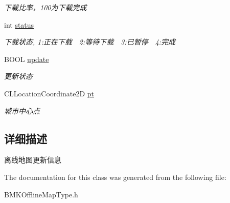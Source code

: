 \begin{DoxyCompactItemize}
\begin{DoxyCompactList}\small\item\em 下载比率，100为下载完成 \end{DoxyCompactList}\item 
\hypertarget{interface_b_m_k_o_l_update_element_a1e980d13929fc0dc732edddf1ae13bf2}{int \hyperlink{interface_b_m_k_o_l_update_element_a1e980d13929fc0dc732edddf1ae13bf2}{status}}\label{interface_b_m_k_o_l_update_element_a1e980d13929fc0dc732edddf1ae13bf2}

\begin{DoxyCompactList}\small\item\em 下载状态, 1\-:正在下载　2\-:等待下载　3\-:已暂停　4\-:完成 \end{DoxyCompactList}\item 
\hypertarget{interface_b_m_k_o_l_update_element_a1adc137eba11d9ae142310d3556bc446}{B\-O\-O\-L \hyperlink{interface_b_m_k_o_l_update_element_a1adc137eba11d9ae142310d3556bc446}{update}}\label{interface_b_m_k_o_l_update_element_a1adc137eba11d9ae142310d3556bc446}

\begin{DoxyCompactList}\small\item\em 更新状态 \end{DoxyCompactList}\item 
\hypertarget{interface_b_m_k_o_l_update_element_a9e229b507ced476146db8f80c71ea5bd}{C\-L\-Location\-Coordinate2\-D \hyperlink{interface_b_m_k_o_l_update_element_a9e229b507ced476146db8f80c71ea5bd}{pt}}\label{interface_b_m_k_o_l_update_element_a9e229b507ced476146db8f80c71ea5bd}

\begin{DoxyCompactList}\small\item\em 城市中心点 \end{DoxyCompactList}\end{DoxyCompactItemize}


\subsection{详细描述}
离线地图更新信息 

The documentation for this class was generated from the following file\-:\begin{DoxyCompactItemize}
\item 
B\-M\-K\-Offline\-Map\-Type.\-h\end{DoxyCompactItemize}
